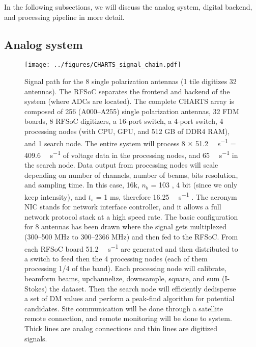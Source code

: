 In the following subsections, we will discuss the analog system, digital backend, and processing pipeline in more detail.


\subsection{Analog system}

\begin{figure}
    \centering
    \texttt{[image: ../figures/CHARTS\_signal\_chain.pdf]}
    \caption[CHARTS signal chain]{Signal path for the 8 single polarization antennas (1 tile digitizes 32 antennas). The RFSoC separates the frontend and backend of the
    system (where ADCs are located). The complete CHARTS array is composed of 256 (A000–A255) single polarization antennas, 32 FDM boards, 8 RFSoC digitizers, a 16-port switch, a 4-port switch, 4 processing nodes (with CPU, GPU, and 512 GB of DDR4 RAM), and 1
    search node. The entire system will process 8 $\times$ 51.2 \si{\giga\bit\per\second} = 409.6 \si{\giga\bit\per\second} of voltage data in the processing nodes, and 65 \si{\giga\bit\per\second}
    in the
    search node. Data output from processing nodes will scale depending on number of channels, number of beams, bits resolution, and sampling
    time. In this case, 16k, $n_b$ = 103
    , 4 bit (since we only keep intensity), and $t_s$ = 1 ms, therefore 16.25 \si{\giga\bit\per\second}
    . The acronym NIC stands for network
    interface controller, and it allows a full network protocol stack at a high speed rate. The basic configuration for 8 antennas has been drawn where
    the signal gets multiplexed (300–500 MHz to 300–2366 MHz) and then fed to the RFSoC. From each RFSoC board 51.2 \si{\giga\bit\per\second}
    are generated
    and then distributed to a switch to feed then the 4 processing nodes (each of them processing 1/4 of the band). Each processing node will calibrate,
    beamform beams, upchannelize, downsample, square, and sum (I-Stokes) the dataset. Then the search node will efficiently dedisperse a set of DM
    values and perform a peak-find algorithm for potential candidates. Site communication will be done through a satellite remote connection, and
    remote monitoring will be done to system. Thick lines are analog connections and thin lines are digitized signals.}
  \end{figure}
